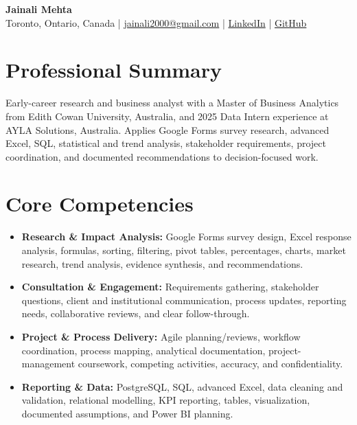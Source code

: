 \documentclass[letterpaper,10pt]{article}
\begin{document}
\begin{center}
  {\fontsize{17}{19}\selectfont\textbf{Jainali Mehta}}\\[2pt]
  \small Toronto, Ontario, Canada \;|\;
  \href{mailto:jainali2000@gmail.com}{jainali2000@gmail.com} \;|\;
  \href{https://www.linkedin.com/in/jainali-mehta}{LinkedIn} \;|\;
  \href{https://github.com/jainalimehta}{GitHub}
\end{center}
\vspace{-7pt}

\section{Professional Summary}
\small Early-career research and business analyst with a Master of Business Analytics from Edith Cowan University, Australia, and 2025 Data Intern experience at AYLA Solutions, Australia. Applies Google Forms survey research, advanced Excel, SQL, statistical and trend analysis, stakeholder requirements, project coordination, and documented recommendations to decision-focused work.

\section{Core Competencies}
\begin{itemize}[leftmargin=0.16in,label=\textbullet,topsep=0pt,itemsep=1pt,parsep=0pt]
  \item \small \textbf{Research \& Impact Analysis:} Google Forms survey design, Excel response analysis, formulas, sorting, filtering, pivot tables, percentages, charts, market research, trend analysis, evidence synthesis, and recommendations.
  \item \small \textbf{Consultation \& Engagement:} Requirements gathering, stakeholder questions, client and institutional communication, process updates, reporting needs, collaborative reviews, and clear follow-through.
  \item \small \textbf{Project \& Process Delivery:} Agile planning/reviews, workflow coordination, process mapping, analytical documentation, project-management coursework, competing activities, accuracy, and confidentiality.
  \item \small \textbf{Reporting \& Data:} PostgreSQL, SQL, advanced Excel, data cleaning and validation, relational modelling, KPI reporting, tables, visualization, documented assumptions, and Power BI planning.
\end{itemize}
\end{document}
